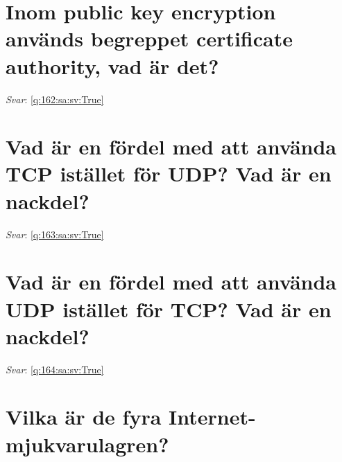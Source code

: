 \documentclass[a4paper,11pt,oneside]{book}
\begin{document}
\begin{sloppypar}
\section{Inom public key encryption anv\"ands begreppet certificate authority, vad \"ar det?}

\label{q:162:sa:sv:False}

\vspace{2cm}

\noindent\makebox[\textwidth]{\hrulefill}

\vspace{1cm}

\textit{Svar}: \autoref{q:162:sa:sv:True}



\section{Vad \"ar en f\"ordel med att anv\"anda TCP ist\"allet f\"or UDP? Vad \"ar en nackdel?}

\label{q:163:sa:sv:False}

\vspace{2cm}

\noindent\makebox[\textwidth]{\hrulefill}

\vspace{1cm}

\textit{Svar}: \autoref{q:163:sa:sv:True}



\section{Vad \"ar en f\"ordel med att anv\"anda UDP ist\"allet f\"or TCP? Vad \"ar en nackdel?}

\label{q:164:sa:sv:False}

\vspace{2cm}

\noindent\makebox[\textwidth]{\hrulefill}

\vspace{1cm}

\textit{Svar}: \autoref{q:164:sa:sv:True}



\section{Vilka \"ar de fyra Internet-mjukvarulagren?}

\label{q:165:sa:sv:False}


\end{sloppypar}
\end{document}
